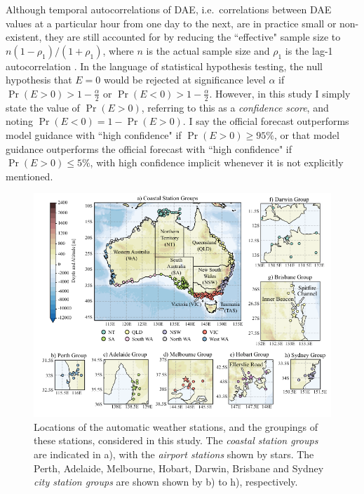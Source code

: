 \documentclass[twocol]{ametsoc}
\DeclareMathOperator{\pr}{Pr}
\begin{document}
Although temporal autocorrelations of DAE, i.e.~correlations between DAE values at a particular hour from one day to the next, are in practice small or non-existent, they are still accounted for by reducing the ``effective" sample size to $ n \left(1-\rho_1\right)/\left(1+\rho_1\right)$, where $n$ is the actual sample size and $\rho_1$ is the lag-1 autocorrelation \citep{zwiers95,wilks11}. In the language of statistical hypothesis testing, the null hypothesis that $E=0$ would be rejected at significance level $\alpha$ if $\pr(E>0) > 1-\frac{\alpha}{2}$ or $\pr(E<0) > 1-\frac{\alpha}{2}$. However, in this study I simply state the value of $\pr(E>0)$, referring to this as a \textit{confidence score}, and noting $\pr(E<0) = 1- \pr(E>0)$. I say the official forecast outperforms model guidance with ``high confidence" if $\pr(E>0) \geq 95\%$, or that model guidance outperforms the  official forecast with ``high confidence" if $\pr(E>0) \leq 5\%$, with high confidence implicit whenever it is not explicitly mentioned.

\begin{figure}
\centering
\includegraphics[width=39pc]{map.pdf}
\caption{Locations of the automatic weather stations, and the groupings of these stations, considered in this study. The \textit{coastal station groups} are indicated in a), with the \textit{airport stations} shown by stars. The Perth, Adelaide, Melbourne, Hobart, Darwin, Brisbane and Sydney \textit{city station groups} are shown shown by b) to h), respectively.}
\label{Fig:map}
\end{figure}
\end{document}
